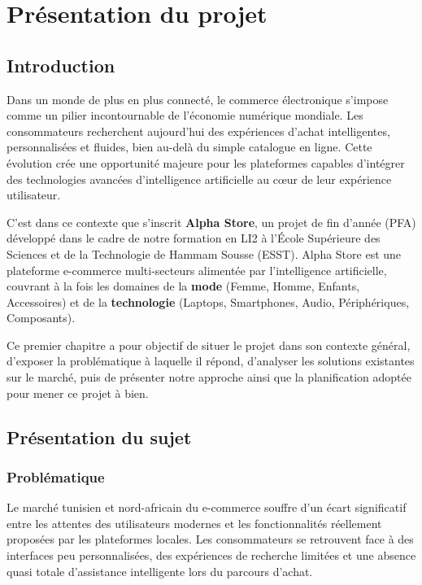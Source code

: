 \chapter{Présentation du projet}
\label{chap:presentation_projet}

\section{Introduction}

Dans un monde de plus en plus connecté, le commerce électronique s'impose comme un pilier incontournable de l'économie numérique mondiale. Les consommateurs recherchent aujourd'hui des expériences d'achat intelligentes, personnalisées et fluides, bien au-delà du simple catalogue en ligne. Cette évolution crée une opportunité majeure pour les plateformes capables d'intégrer des technologies avancées d'intelligence artificielle au cœur de leur expérience utilisateur.

C'est dans ce contexte que s'inscrit \textbf{Alpha Store}, un projet de fin d'année (PFA) développé dans le cadre de notre formation en LI2 à l'École Supérieure des Sciences et de la Technologie de Hammam Sousse (ESST). Alpha Store est une plateforme e-commerce multi-secteurs alimentée par l'intelligence artificielle, couvrant à la fois les domaines de la \textbf{mode} (Femme, Homme, Enfants, Accessoires) et de la \textbf{technologie} (Laptops, Smartphones, Audio, Périphériques, Composants).

Ce premier chapitre a pour objectif de situer le projet dans son contexte général, d'exposer la problématique à laquelle il répond, d'analyser les solutions existantes sur le marché, puis de présenter notre approche ainsi que la planification adoptée pour mener ce projet à bien.

\section{Présentation du sujet}

\subsection{Problématique}

Le marché tunisien et nord-africain du e-commerce souffre d'un écart significatif entre les attentes des utilisateurs modernes et les fonctionnalités réellement proposées par les plateformes locales. Les consommateurs se retrouvent face à des interfaces peu personnalisées, des expériences de recherche limitées et une absence quasi totale d'assistance intelligente lors du parcours d'achat.

